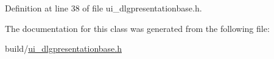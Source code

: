 Definition at line 38 of file ui\+\_\+dlgpresentationbase.\+h.



The documentation for this class was generated from the following file\+:\begin{DoxyCompactItemize}
\item 
build/\hyperlink{ui__dlgpresentationbase_8h}{ui\+\_\+dlgpresentationbase.\+h}\end{DoxyCompactItemize}
